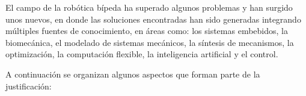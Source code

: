 El campo de la rob\'otica b\'ipeda ha superado algunos problemas y han surgido unos nuevos, en donde las soluciones encontradas han sido generadas integrando m\'ultiples fuentes de conocimiento, en \'areas como: los sistemas embebidos\cite{Barker2010,Pan2010,Kimm2012,Wang2011,Amir2013}, la biomec\'anica\cite{Mahmoodi2013,Lim2014,Wu2013,Aoustin2013,Chiang2013,Xiang2010,Hobon2014}, el modelado de sistemas mec\'anicos\cite{Chiang2013}, la s\'intesis de mecanismos\cite{Li2008,Aoustin2013,Wu2013a,Xu2013,Hobon2014}, la optimizaci\'on\cite{Xiang2010,Lim2014,Kherici2014,Mahmoodabadi2014}, la computaci\'on flexible\cite{Wang2013,Kherici2014,Mahmoodabadi2014}, la inteligencia artificial\cite{Treesatayapun2014,Yuan2014,Wu2014,Wang2013} y el control\cite{Dou2013,Treesatayapun2014,Yuan2014,Wu2014}.\par
A continuaci\'on se organizan algunos aspectos que forman parte de la justificaci\'on:
